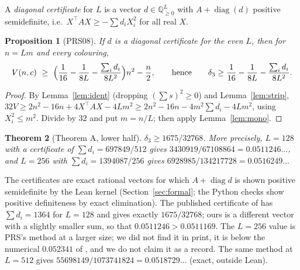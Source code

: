 \documentclass[11pt]{amsart}
\newtheorem{theorem}{Theorem}[section]
\newtheorem{proposition}[theorem]{Proposition}
\theoremstyle{remark}
\newcommand{\Q}{\mathbb{Q}}
\newcommand{\mono}{V}
\begin{document}
A \emph{diagonal certificate} for $L$ is a vector $d\in\Q^L_{\ge0}$ with $A+\operatorname{diag}(d)$ positive semidefinite, i.e.\ $X^{\top}AX\ge-\sum d_iX_i^2$ for all real $X$.

\begin{proposition}[PRS08]\label{prop:prs}
If $d$ is a diagonal certificate for the even $L$, then for $n=Lm$ and every colouring,
\[\mono(n,c)\ \ge\ \Bigl(\frac1{16}-\frac1{8L}-\frac{\sum_id_i}{8L^2}\Bigr)n^2-\frac n2,\qquad\text{hence}\qquad \delta_3\ge\frac1{16}-\frac1{8L}-\frac{\sum_id_i}{8L^2}.\]
\end{proposition}
\begin{proof}
By Lemma~\ref{lem:ident} (dropping $(\sum s)^2\ge0$) and Lemma~\ref{lem:strip}, $32\mono\ge2n^2-16n+4X^{\top}AX-4Lm^2\ge2n^2-16n-4m^2\sum d_i-4Lm^2$, using $X_i^2\le m^2$.
Divide by $32$ and put $m=n/L$; then apply Lemma~\ref{lem:mono}.
\end{proof}

\begin{theorem}[Theorem A, lower half]\label{thm:Alow}
$\delta_3\ge1675/32768$. More precisely, $L=128$ with a certificate of $\sum d_i=697849/512$ gives $3430919/67108864=0.0511246\ldots$, and $L=256$ with $\sum d_i=1394087/256$ gives
$6928985/134217728=0.0516249\ldots$
\end{theorem}
The certificates are exact rational vectors for which $A+\operatorname{diag}d$ is shown positive semidefinite by the Lean kernel (Section~\ref{sec:formal}; the Python checks show positive definiteness by exact elimination). The published certificate of
\cite{PRS08} has $\sum d_i=1364$ for $L=128$ and gives exactly $1675/32768$; ours is a different vector with a slightly smaller sum, so that $0.0511246>0.0511169$. The $L=256$ value is PRS's method at a larger size; we did not find it in print, it is
below the numerical $0.052341$ of \cite{Sjoland14}, and we do not claim it as a record. The same method at $L=512$ gives $55698149/1073741824=0.0518729\ldots$ (exact, outside Lean).
\end{document}

